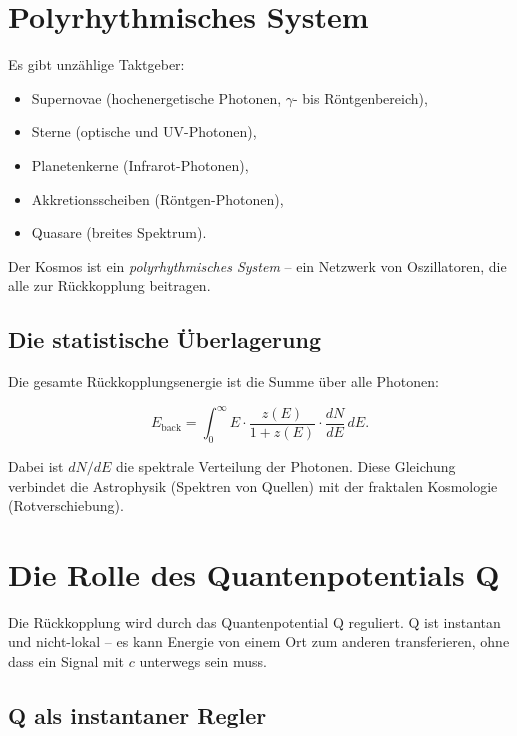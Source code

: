 \section{Polyrhythmisches System}

Es gibt unzählige Taktgeber:

\begin{itemize}
    \item Supernovae (hochenergetische Photonen, \(\gamma\)- bis Röntgenbereich),
    \item Sterne (optische und UV-Photonen),
    \item Planetenkerne (Infrarot-Photonen),
    \item Akkretionsscheiben (Röntgen-Photonen),
    \item Quasare (breites Spektrum).
\end{itemize}

Der Kosmos ist ein \emph{polyrhythmisches System} – ein Netzwerk von Oszillatoren, die alle zur Rückkopplung beitragen.

\subsection{Die statistische Überlagerung}

Die gesamte Rückkopplungsenergie ist die Summe über alle Photonen:

\begin{equation}
E_{\text{back}} = \int_0^\infty E \cdot \frac{z(E)}{1+z(E)} \cdot \frac{dN}{dE} \, dE. \tag{4.4}
\end{equation}

Dabei ist \(dN/dE\) die spektrale Verteilung der Photonen. Diese Gleichung verbindet die Astrophysik (Spektren von Quellen) mit der fraktalen Kosmologie
(Rotverschiebung).

\section{Die Rolle des Quantenpotentials Q}

Die Rückkopplung wird durch das Quantenpotential Q reguliert. Q ist instantan und nicht-lokal – es kann Energie von einem Ort zum anderen transferieren, ohne dass
ein Signal mit \(c\) unterwegs sein muss.

\subsection{Q als instantaner Regler}

